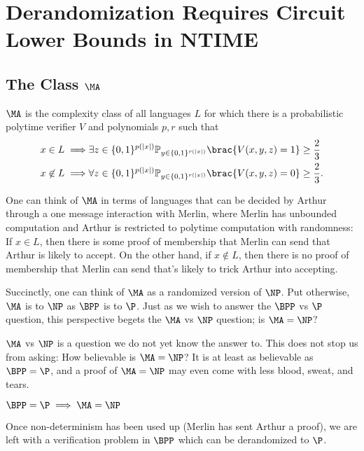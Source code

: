 \chapter{Derandomization Requires Circuit Lower Bounds in NTIME}\label{lec:11}

\section[\texorpdfstring{The Class $\MA$}{The Class MA}]{The Class $\MA$}

\begin{definition}[$\MA$]
  $\MA$ is the complexity class of all languages $L$ for which there is a probabilistic 
  polytime verifier $V$ and polynomials $p,r$ such that
  \begin{align*}
      x \in L \implies &
      \exists z \in \set{0,1}^{p(|x|)} \Pr_{y \in \set{0,1}^{r(|x|)}} \brac{V(x,y,z) = 1} \ge \frac{2}{3}
      \\
      x \not\in L \implies &
      \forall z \in \set{0,1}^{p(|x|)} \Pr_{y \in \set{0,1}^{r(|x|)}} \brac{V(x,y,z) = 0} \ge \frac{2}{3}.
  \end{align*}
\end{definition}

One can think of $\MA$ in terms of languages that can be decided by Arthur through a one 
message interaction with Merlin, where Merlin has unbounded computation and Arthur is 
restricted to polytime computation with randomness:
If $x \in L$, then there is some proof of membership that Merlin can send that Arthur is 
likely to accept.
On the other hand, if $x \not\in L$, then there is no proof of membership that Merlin can 
send that's likely to trick Arthur into accepting.

Succinctly, one can think of $\MA$ as a randomized version of $\NP$.
Put otherwise, $\MA$ is to $\NP$ as $\BPP$ is to $\P$.
Just as we wish to answer the $\BPP$ vs $\P$ question, this perspective begets the $\MA$ vs
$\NP$ question; is $\MA = \NP$?

$\MA$ vs $\NP$ is a question we do not yet know the answer to.
This does not stop us from asking:
How believable is $\MA = \NP$?
It is at least as believable as $\BPP = \P$, and a proof of $\MA = \NP$ may even come with
less blood, sweat, and tears.
\begin{lemma}\label{lem:manp-ez}
  $\BPP = \P \implies \MA = \NP$
\end{lemma}
\begin{proofsk}
  Once non-determinism has been used up (Merlin has sent Arthur a proof), we are left with
  a verification problem in $\BPP$ which can be derandomized to $\P$.
\end{proofsk}


